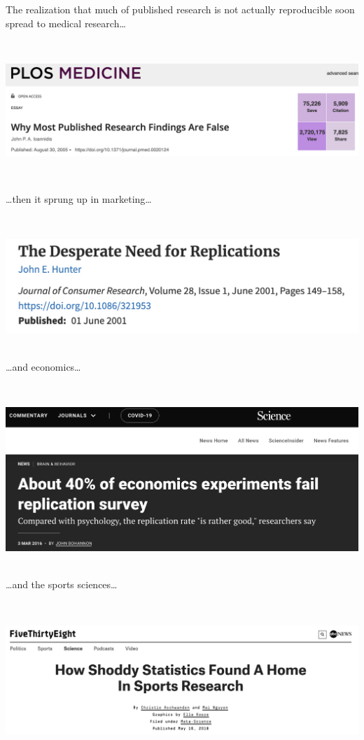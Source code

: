 \documentclass[
]{book}
\begin{document}
The realization that much of published research is not actually reproducible soon spread to medical research\ldots{}

~

\includegraphics{img/reproducibility-psych.png}

~

\ldots then it sprung up in marketing\ldots{}

~

\includegraphics{img/reproducibility-marketing.png}
~

\ldots and economics\ldots{}

~

\includegraphics{img/reproducibility-econ.png}
~

\ldots and the sports sciences\ldots{}

~

\includegraphics{img/reproducibility-sports.png}
~
\end{document}

